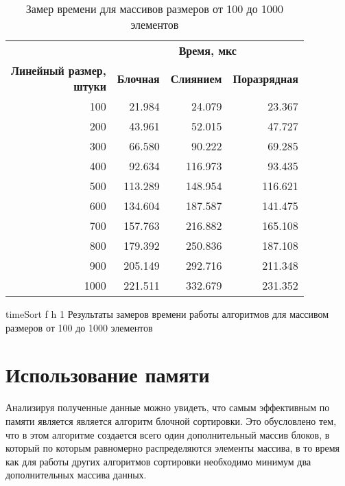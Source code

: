 \begin{table}[ht]
	\small
	\begin{center}
		\begin{threeparttable}
			\caption{Замер времени для массивов размеров от 100 до 1000 элементов}
			\label{tbl:time}
			\begin{tabular}{|r|r|r|r|}
				\hline
				& \multicolumn{3}{c|}{\bfseries Время, мкс} \\ \cline{2-4}
				\bfseries \makecell{Линейный размер, \\ штуки} & \bfseries Блочная & \bfseries Слиянием & \bfseries Поразрядная \\ \cline{2-4}
				\hline
				100 & 21.984 & 24.079 & 23.367 \\
				\hline
				200 & 43.961 & 52.015 & 47.727 \\
				\hline
				300 & 66.580 & 90.222 & 69.285 \\
				\hline
				400 & 92.634 & 116.973 & 93.435 \\
				\hline
				500 & 113.289 & 148.954 & 116.621 \\
				\hline
				600 & 134.604 & 187.587 & 141.475 \\
				\hline
				700 & 157.763 & 216.882 & 165.108 \\
				\hline
				800 & 179.392 & 250.836 & 187.108 \\
				\hline
				900 & 205.149 & 292.716 & 211.348 \\
				\hline
				1000 & 221.511 & 332.679 & 231.352 \\
				\hline
			\end{tabular}	
		\end{threeparttable}
	\end{center}
\end{table}

{timeSort} %
{f} %
{h} %
{1\textwidth} %
{Результаты замеров времени работы алгоритмов для массивом размеров от 100 до 1000 элементов} %

\clearpage

\section{Использование памяти}

Анализируя полученные данные можно увидеть, что самым эффективным по памяти является является алгоритм блочной сортировки. Это обусловлено тем, что в
этом алгоритме создается всего один дополнительный массив блоков, в который по которым равномерно распределяются элементы массива, в то время как для работы других алгоритмов сортировки необходимо минимум два дополнительных массива данных.

